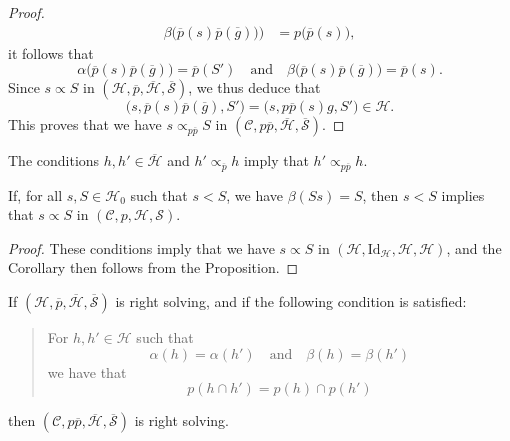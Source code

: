 \documentclass[a4paper,fleqn]{article}
\theoremstyle{plain}
\newenvironment{corollary}[1]
  {\renewcommand\theinnercorollary{#1}\innercorollary}
  {\endinnercorollary}
\theoremstyle{definition}
\newcommand{\textand}{\quad\text{and}\quad}
\newcommand{\CC}{\mathcal{C}}
\newcommand{\HH}{\mathcal{H}}
\newcommand{\bHH}{\overline{\HH}}
\renewcommand{\SS}{\mathcal{S}}
\newcommand{\bSS}{\overline{\SS}}
\newcommand{\subs}{\mathrel{\propto}}
\newcommand{\Id}{\mathrm{Id}}
\begin{document}
\begin{proof}
\[\begin{aligned}
        \beta\big(
          \overline{p}(s)\overline{p}(\overline{g})
        \big)
      \big)
      &= p\big(
        \overline{p}(s)
      \big),
    \end{aligned}
  \]
  it follows that
  \[
    \alpha\big(
      \overline{p}(s)\overline{p}(\overline{g})
    \big)
    = \overline{p}(S')
    \textand
    \beta\big(
      \overline{p}(s)\overline{p}(\overline{g})
    \big)
    = \overline{p}(s).
  \]
  Since $s\subs S$ in $(\HH,\overline{p},\bHH,\bSS)$, we thus deduce that
  \[
    \big(
      s, \overline{p}(s)\overline{p}(\overline{g}), S'
    \big)
    = \big(
      s, p\overline{p}(s)g, S'
    \big)
    \in\HH.
  \]
  This proves that we have $s\subs_{p\overline{p}}S$ in $(\CC,p\overline{p},\bHH,\bSS)$.
\end{proof}

\begin{corollary}{1}
  The conditions $h,h'\in\bHH$ and $h'\subs_{\overline{p}}h$ imply that $h'\subs_{p\overline{p}}h$.
\end{corollary}

\begin{corollary}{2}
  If, for all $s,S\in\HH_0$ such that $s<S$, we have $\beta(Ss)=S$, then $s<S$ implies that $s\subs S$ in $(\CC,p,\HH,\SS)$.
\end{corollary}

\begin{proof}
  These conditions imply that we have $s\subs S$ in $(\HH,\Id_\HH,\HH,\HH)$, and the Corollary then follows from the Proposition.
\end{proof}

\begin{corollary}{3}
  If $(\HH,\overline{p},\bHH,\bSS)$ is right solving, and if the following condition is satisfied:
  \begin{quote}
    For $h,h'\in\HH$ such that
    \[
      \alpha(h)=\alpha(h')
      \textand
      \beta(h)=\beta(h')
    \]
    we have that
    \[
      p(h\cap h')
      = p(h)\cap p(h')
    \]
  \end{quote}
  then $(\CC,p\overline{p},\bHH,\bSS)$ is right solving.
\end{corollary}
\end{document}
